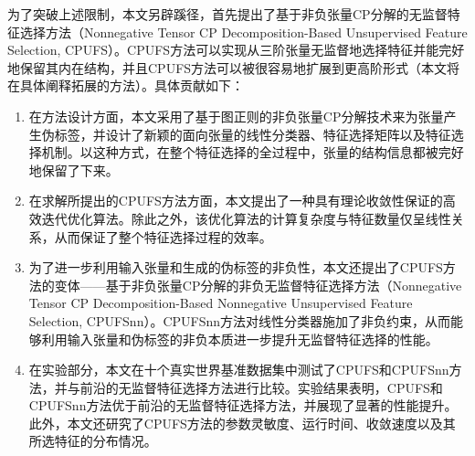 为了突破上述限制，本文另辟蹊径，首先提出了基于非负张量CP分解的无监督特征选择方法（Nonnegative Tensor CP Decomposition-Based Unsupervised Feature Selection, CPUFS）。CPUFS方法可以实现从三阶张量无监督地选择特征并能完好地保留其内在结构，并且CPUFS方法可以被很容易地扩展到更高阶形式（本文将在具体阐释拓展的方法）。具体贡献如下：
\begin{enumerate}
    \item 在方法设计方面，本文采用了基于图正则的非负张量CP分解技术来为张量产生伪标签，并设计了新颖的面向张量的线性分类器、特征选择矩阵以及特征选择机制。以这种方式，在整个特征选择的全过程中，张量的结构信息都被完好地保留了下来。
    \item 在求解所提出的CPUFS方法方面，本文提出了一种具有理论收敛性保证的高效迭代优化算法。除此之外，该优化算法的计算复杂度与特征数量仅呈线性关系，从而保证了整个特征选择过程的效率。
    \item 为了进一步利用输入张量和生成的伪标签的非负性，本文还提出了CPUFS方法的变体——基于非负张量CP分解的非负无监督特征选择方法（Nonnegative Tensor CP Decomposition-Based Nonnegative Unsupervised Feature Selection, CPUFSnn）。CPUFSnn方法对线性分类器施加了非负约束，从而能够利用输入张量和伪标签的非负本质进一步提升无监督特征选择的性能。
    \item 在实验部分，本文在十个真实世界基准数据集中测试了CPUFS和CPUFSnn方法，并与前沿的无监督特征选择方法进行比较。实验结果表明，CPUFS和CPUFSnn方法优于前沿的无监督特征选择方法，并展现了显著的性能提升。此外，本文还研究了CPUFS方法的参数灵敏度、运行时间、收敛速度以及其所选特征的分布情况。
\end{enumerate}

